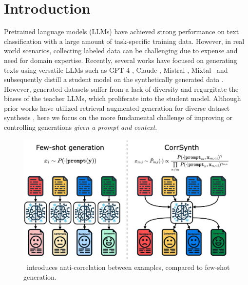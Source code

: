 
\section{Introduction}
 Pretrained language models (LLMs) \citep{devlin-etal-2019-bert} have achieved strong performance on text classification with a large amount of task-specific training data. However, in real world scenarios, collecting labeled data can be challenging due to expense and need for domain expertise.
Recently, several works have focused on generating texts using versatile LLMs such as GPT-4 \citep{Achiam2023GPT4TR}, Claude \citep{Bai2022TrainingAH}, Mistral \citep{jiang2023mistral}, Mixtal~\citep{jiang2024mixtral} and subsequently distill a student model on the synthetically generated data \citep{west-etal-2022-symbolic}. However, generated datasets suffer from a lack of diversity \citep{yu2023large} and regurgitate the biases of the teacher LLMs, which proliferate into the student model. Although prior works have utilized retrieval augmented generation for diverse dataset synthesis \citep{divekar2024synthesizrr}, here we focus on the more fundamental challenge of improving or controlling generations \emph{given a prompt and context}.


\begin{figure}[t!]
\centering
    \includegraphics[width=0.95\linewidth]{figure/high-level-diagram-04-Oct-2024.jpg}
    \caption{\corrsyn\ introduces anti-correlation \mbox{between} examples, compared to few-shot generation.}
    \label{fig:corrsynth_high_level}
\vspace{-3ex}
\end{figure}

